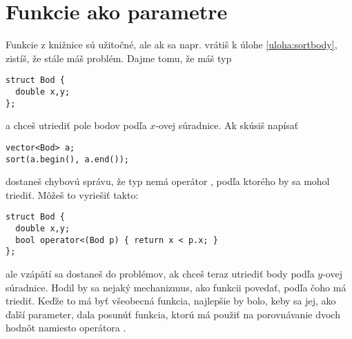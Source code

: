 \chapter{Funkcie ako parametre}
\label{sec:lambdy}

Funkcie z knižnice  sú užitočné, ale ak sa napr. vrátiš
k úlohe \ref{uloha:sortbody}, zistíš, že stále máš problém.
Dajme tomu, že máš typ
\begin{lstlisting}
struct Bod {
  double x,y;
};
\end{lstlisting}
a chceš utriediť pole bodov podľa $x$-ovej súradnice. Ak skúsiš napísať
\begin{lstlisting}
vector<Bod> a;
sort(a.begin(), a.end());
\end{lstlisting}
dostaneš chybovú správu, že typ  nemá operátor \vb{<}, podľa ktorého
by sa mohol triediť. Môžeš to vyriešiť takto:
\begin{lstlisting}
struct Bod {
  double x,y;
  bool operator<(Bod p) { return x < p.x; }
};
\end{lstlisting}
ale vzápätí sa dostaneš do problémov, ak chceš teraz utriediť body podľa $y$-ovej súradnice.
Hodil by sa nejaký mechanizmus, ako funkcii  povedať, podľa čoho má triediť.
Keďže to má byť všeobecná funkcia, najlepšie by bolo, keby sa jej, ako ďalší
parameter, dala posunúť funkcia, ktorú má použiť na porovnávanie dvoch hodnôt
namiesto operátora \vb{<}.

